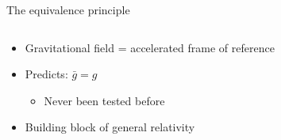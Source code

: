 \documentclass{beamer}
\begin{document}
  
\begin{frame}{\centering The equivalence principle}
  \begin{columns}
    \begin{column}{0.39\textwidth}
        \begin{itemize}
        \item{Gravitational field = accelerated frame of reference}
        \item{Predicts: $\bar g= g$}
          \begin{itemize}
          \item{Never been tested before}
          \end{itemize}
        \item{Building block of general relativity}
          \begin{itemize}
          \end{itemize}
      \end{itemize}
    \end{column}
    \begin{column}{0.65\textwidth}
      \begin{figure}
      \end{figure}
    \end{column}
  \end{columns}
  \end{frame}
\end{document}
